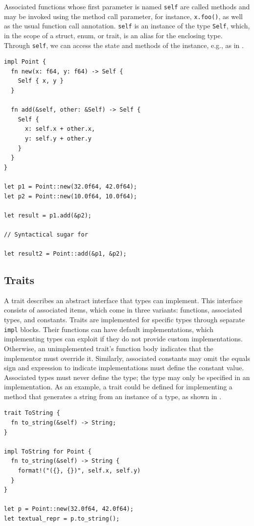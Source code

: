 \documentclass[paper=a4,%
  twoside,%
  BCOR4mm,%
  abstract=true,%
  toc=bibliography,%
  chapterprefix=true,%
  toc=bibliographynumbered,%
  open=right,%
  english,%
  pagesize=pdftex]{scrreprt}
\begin{document}
Associated functions whose first parameter is named \texttt{self} are called methods and may be invoked using the method call parameter, for instance, \texttt{x.foo()}, as well as the usual function call annotation. \texttt{self} is an instance of the type \texttt{Self}, which, in the scope of a struct, enum, or trait, is an alias for the enclosing type. Through \texttt{self}, we can access the state and methods of the instance, e.g., as in .

\begin{lstlisting}[style=boxed, caption={Defining a method on \texttt{Point} data type from \Cref{lst:example-struct-enum}}, label=lst:example-method]
impl Point {
  fn new(x: f64, y: f64) -> Self {
    Self { x, y }
  }

  fn add(&self, other: &Self) -> Self {
    Self {
      x: self.x + other.x,
      y: self.y + other.y
    }
  }
}

let p1 = Point::new(32.0f64, 42.0f64);
let p2 = Point::new(10.0f64, 10.0f64);

let result = p1.add(&p2);

// Syntactical sugar for

let result2 = Point::add(&p1, &p2);
\end{lstlisting}


\subsection{Traits}
A trait describes an abstract interface that types can implement. This interface consists of associated items, which come in three variants: functions, associated types, and constants. Traits are implemented for specific types through separate \texttt{impl} blocks. Their functions can have default implementations, which implementing types can exploit if they do not provide custom implementations. Otherwise, an unimplemented trait's function body indicates that the implementor must override it. Similarly, associated constants may omit the equals sign and expression to indicate implementations must define the constant value. Associated types must never define the type; the type may only be specified in an implementation. As an example, a trait could be defined for implementing a method that generates a string from an instance of a type, as shown in .

\begin{lstlisting}[style=boxed, caption={Trait definition and implementation for the \texttt{Point} data type from \Cref{lst:example-struct-enum}}, label=lst:example-trait]
trait ToString {
  fn to_string(&self) -> String;
}

impl ToString for Point {
  fn to_string(&self) -> String {
    format!("({}, {})", self.x, self.y)
  }
}

let p = Point::new(32.0f64, 42.0f64);
let textual_repr = p.to_string();
\end{lstlisting}
\end{document}
